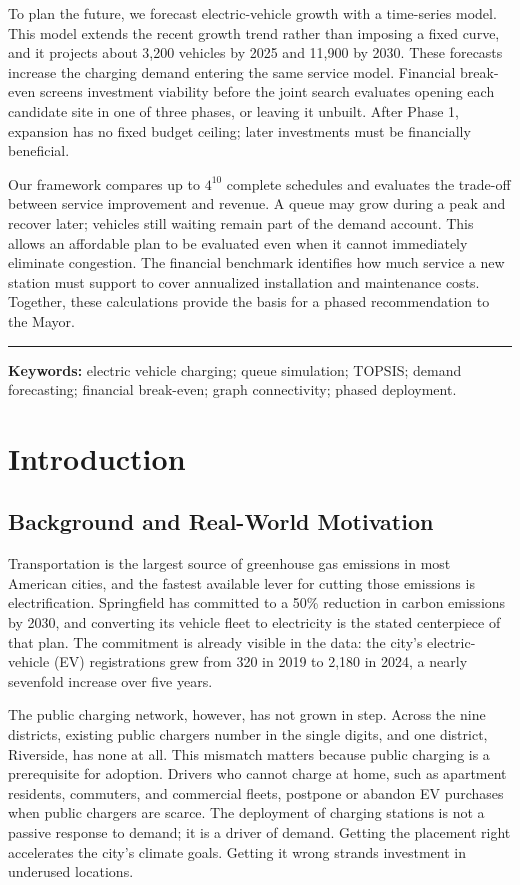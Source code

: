 \documentclass[12pt]{article}
\begin{document}
To plan the future, we forecast electric-vehicle growth with a time-series model. This
model extends the recent growth trend rather than imposing a fixed curve, and it projects
about 3,200 vehicles by 2025 and 11,900 by 2030. These forecasts increase the charging
demand entering the same service model. Financial break-even screens investment viability
before the joint search evaluates opening each candidate site in one of three phases, or leaving it unbuilt.
After Phase 1, expansion has no fixed budget ceiling; later investments must be
financially beneficial.

Our framework compares up to $4^{10}$ complete schedules and evaluates the trade-off
between service improvement and revenue. A queue may grow during a peak and recover
later; vehicles still waiting remain part of the demand account. This allows an
affordable plan to be evaluated even when it cannot immediately eliminate congestion.
The financial benchmark identifies how much service a new station must support to
cover annualized installation and maintenance costs. Together, these calculations
provide the basis for a phased recommendation to the Mayor.

\vspace{8pt}\hrule\vspace{3pt}
\noindent\textbf{Keywords:} electric vehicle charging; queue simulation; TOPSIS;
demand forecasting; financial break-even; graph connectivity; phased deployment.

\clearpage
{\small\tableofcontents}
\clearpage
\section{Introduction}

\subsection{Background and Real-World Motivation}

Transportation is the largest source of greenhouse gas emissions in most American cities,
and the fastest available lever for cutting those emissions is electrification. Springfield
has committed to a 50\% reduction in carbon emissions by 2030, and converting its
vehicle fleet to electricity is the stated centerpiece of that plan. The commitment is
already visible in the data: the city's electric-vehicle (EV) registrations grew from 320
in 2019 to 2,180 in 2024, a nearly sevenfold increase over five years.

The public charging network, however, has not grown in step. Across the nine districts,
existing public chargers number in the single digits, and one district, Riverside, has
none at all. This mismatch matters because public charging is a prerequisite for adoption.
Drivers who cannot charge at home, such as apartment residents, commuters, and commercial
fleets, postpone or abandon EV purchases when public chargers are scarce. The deployment of
charging stations is not a passive response to demand; it is a driver of demand.
Getting the placement right accelerates the city's climate goals. Getting it wrong strands
investment in underused locations.
\end{document}
